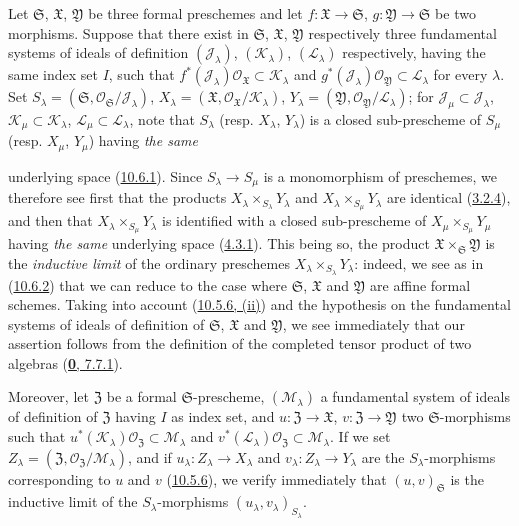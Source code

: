 \begin{env}[10.7.4]
\label{I.10.7.4}
Let $\mathfrak{S}$, $\mathfrak{X}$, $\mathfrak{Y}$ be three formal
preschemes and let $f:\mathfrak{X}\to\mathfrak{S}$,
$g:\mathfrak{Y}\to\mathfrak{S}$ be two morphisms. Suppose that there
exist in $\mathfrak{S}$, $\mathfrak{X}$, $\mathfrak{Y}$ respectively
three fundamental systems of ideals of definition
$(\mathscr{J}_\lambda)$, $(\mathscr{K}_\lambda)$,
$(\mathscr{L}_\lambda)$ respectively, having the same index set
$I$, such that
$f^*(\mathscr{J}_\lambda)\mathscr{O}_{\mathfrak{X}}
\subset\mathscr{K}_\lambda$ and
$g^*(\mathscr{J}_\lambda)\mathscr{O}_{\mathfrak{Y}}
\subset\mathscr{L}_\lambda$ for every $\lambda$. Set
$S_\lambda=(\mathfrak{S},
\mathscr{O}_{\mathfrak{S}}/\mathscr{J}_\lambda)$,
$X_\lambda=(\mathfrak{X},
\mathscr{O}_{\mathfrak{X}}/\mathscr{K}_\lambda)$,
$Y_\lambda=(\mathfrak{Y},
\mathscr{O}_{\mathfrak{Y}}/\mathscr{L}_\lambda)$; for
$\mathscr{J}_\mu\subset\mathscr{J}_\lambda$,
$\mathscr{K}_\mu\subset\mathscr{K}_\lambda$,
$\mathscr{L}_\mu\subset\mathscr{L}_\lambda$, note that
$S_\lambda$ (resp. $X_\lambda$, $Y_\lambda$) is a closed sub-prescheme
of $S_\mu$ (resp. $X_\mu$, $Y_\mu$) having \emph{the same}


underlying space (\hyperref[I.10.6.1]{10.6.1}). Since
$S_\lambda\to S_\mu$ is a monomorphism of preschemes, we therefore see
first that the products
$X_\lambda\times_{S_\lambda}Y_\lambda$ and
$X_\lambda\times_{S_\mu}Y_\lambda$ are identical
(\hyperref[I.3.2.4]{3.2.4}), and then that
$X_\lambda\times_{S_\mu}Y_\lambda$ is identified with a closed
sub-prescheme of $X_\mu\times_{S_\mu}Y_\mu$ having \emph{the same} underlying
space (\hyperref[I.4.3.1]{4.3.1}). This being so, the product
$\mathfrak{X}\times_{\mathfrak{S}}\mathfrak{Y}$ is the
\emph{inductive limit} of the ordinary preschemes
$X_\lambda\times_{S_\lambda}Y_\lambda$: indeed, we see as in
(\hyperref[I.10.6.2]{10.6.2}) that we can reduce to the case where
$\mathfrak{S}$, $\mathfrak{X}$ and $\mathfrak{Y}$ are affine formal
schemes. Taking into account (\hyperref[I.10.5.6]{10.5.6, (ii)}) and
the hypothesis on the fundamental systems of ideals of definition of
$\mathfrak{S}$, $\mathfrak{X}$ and $\mathfrak{Y}$, we see immediately
that our assertion follows from the definition of the completed tensor
product of two algebras (\hyperref[0.7.7.1]{\textbf{0}, 7.7.1}).

Moreover, let $\mathfrak{Z}$ be a formal $\mathfrak{S}$-prescheme,
$(\mathscr{M}_\lambda)$ a fundamental system of ideals of definition of
$\mathfrak{Z}$ having $I$ as index set, and
$u:\mathfrak{Z}\to\mathfrak{X}$,
$v:\mathfrak{Z}\to\mathfrak{Y}$ two $\mathfrak{S}$-morphisms such that
$u^*(\mathscr{K}_\lambda)\mathscr{O}_{\mathfrak{Z}}
\subset\mathscr{M}_\lambda$ and
$v^*(\mathscr{L}_\lambda)\mathscr{O}_{\mathfrak{Z}}
\subset\mathscr{M}_\lambda$. If we set
$Z_\lambda=(\mathfrak{Z},
\mathscr{O}_{\mathfrak{Z}}/\mathscr{M}_\lambda)$, and if
$u_\lambda:Z_\lambda\to X_\lambda$ and
$v_\lambda:Z_\lambda\to Y_\lambda$ are the $S_\lambda$-morphisms
corresponding to $u$ and $v$ (\hyperref[I.10.5.6]{10.5.6}), we
verify immediately that $(u,v)_{\mathfrak{S}}$ is the inductive limit
of the $S_\lambda$-morphisms $(u_\lambda,v_\lambda)_{S_\lambda}$.


\end{env}
